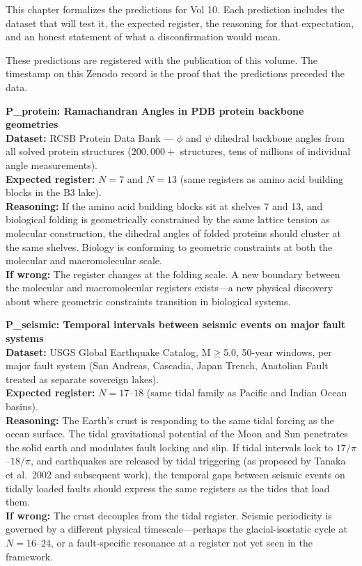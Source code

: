 \documentclass[11pt, letterpaper, openany]{book}
\begin{document}
This chapter formalizes the predictions for Vol 10. Each prediction includes the
dataset that will test it, the expected register, the reasoning for that
expectation, and an honest statement of what a disconfirmation would mean.

These predictions are registered with the publication of this volume. The
timestamp on this Zenodo record is the proof that the predictions preceded the
data.

\begin{predictionbox}
\textbf{P\_protein: Ramachandran Angles in PDB protein backbone geometries}\\[0.5em]
\textbf{Dataset:} RCSB Protein Data Bank --- $\phi$ and $\psi$ dihedral backbone
angles from all solved protein structures ($200{,}000+$ structures, tens of millions
of individual angle measurements).\\[0.5em]
\textbf{Expected register:} $N=7$ and $N=13$ (same registers as amino acid building
blocks in the B3 lake).\\[0.5em]
\textbf{Reasoning:} If the amino acid building blocks sit at shelves 7 and 13, and
biological folding is geometrically constrained by the same lattice tension as
molecular construction, the dihedral angles of folded proteins should cluster at
the same shelves. Biology is conforming to geometric constraints at both the
molecular and macromolecular scale.\\[0.5em]
\textbf{If wrong:} The register changes at the folding scale. A new boundary
between the molecular and macromolecular registers exists---a new physical discovery
about where geometric constraints transition in biological systems.
\end{predictionbox}

\begin{predictionbox}
\textbf{P\_seismic: Temporal intervals between seismic events on major fault systems}\\[0.5em]
\textbf{Dataset:} USGS Global Earthquake Catalog, M$\geq$5.0, 50-year windows,
per major fault system (San Andreas, Cascadia, Japan Trench, Anatolian Fault
treated as separate sovereign lakes).\\[0.5em]
\textbf{Expected register:} $N=17$--$18$ (same tidal family as Pacific and Indian
Ocean basins).\\[0.5em]
\textbf{Reasoning:} The Earth's crust is responding to the same tidal forcing as
the ocean surface. The tidal gravitational potential of the Moon and Sun
penetrates the solid earth and modulates fault locking and slip. If tidal intervals
lock to $17/\pi$--$18/\pi$, and earthquakes are released by tidal triggering
(as proposed by Tanaka et al.\ 2002 and subsequent work), the temporal gaps between
seismic events on tidally loaded faults should express the same registers as the
tides that load them.\\[0.5em]
\textbf{If wrong:} The crust decouples from the tidal register. Seismic periodicity
is governed by a different physical timescale---perhaps the glacial-isostatic
cycle at $N=16$--$24$, or a fault-specific resonance at a register not yet
seen in the framework.
\end{predictionbox}
\end{document}
